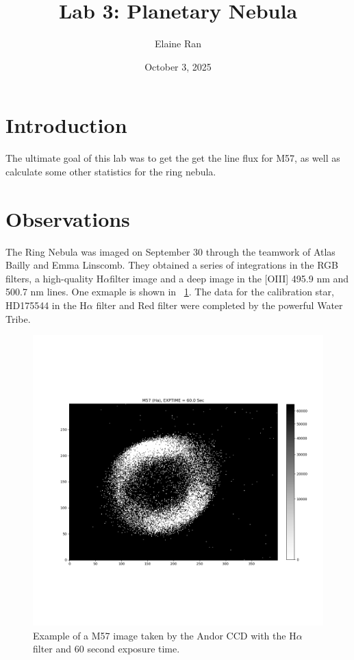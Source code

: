 \documentclass{article}
\title{Lab 3: Planetary Nebula}
\author{Elaine Ran}
\date{October 3, 2025}
\begin{document}
\maketitle

\section{Introduction}
The ultimate goal of this lab was to get the get the line flux for M57, as well as calculate some other statistics for the ring nebula. 

\section{Observations}
The Ring Nebula was imaged on September 30 through the teamwork of Atlas Bailly and Emma Linscomb. They obtained a series of integrations in the RGB filters, a high-quality H$\alpha$filter image and a deep image in the [OIII] 495.9 nm and 500.7 nm lines. One exmaple is shown in ~\ref{fig:M57Haplain}. The data for the calibration star, HD175544 in the H$\alpha$ filter and Red filter were completed by the powerful Water Tribe.

\begin{figure}[h!]
    \includegraphics[width=\textwidth]{Figures/M57_Ha_plain.png}
    \caption{Example of a M57 image taken by the Andor CCD with the H$\alpha$ filter and 60 second exposure time.}
    \label{fig:M57Haplain}
\end{figure}
\end{document}
